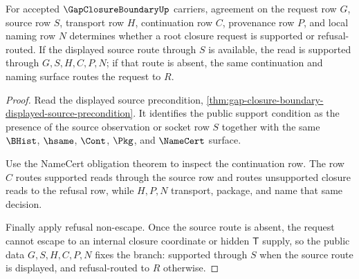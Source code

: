 \begin{theorem}
\label{thm:gap-closure-boundary-closure-request-determinacy}
For accepted $\GapClosureBoundaryUp$ carriers, agreement on the request row $G$, source row $S$, transport row $H$, continuation row $C$, provenance row $P$, and local naming row $N$ determines whether a root closure request is supported or refusal-routed. If the displayed source route through $S$ is available, the read is supported through $G,S,H,C,P,N$; if that route is absent, the same continuation and naming surface routes the request to $R$.
\end{theorem}
\begin{proof}
Read the displayed source precondition, \autoref{thm:gap-closure-boundary-displayed-source-precondition}. It identifies the public support condition as the presence of the source observation or socket row $S$ together with the same $\BHist$, $\hsame$, $\Cont$, $\Pkg$, and $\NameCert$ surface.

Use the NameCert obligation theorem to inspect the continuation row. The row $C$ routes supported reads through the source row and routes unsupported closure reads to the refusal row, while $H,P,N$ transport, package, and name that same decision.

Finally apply refusal non-escape. Once the source route is absent, the request cannot escape to an internal closure coordinate or hidden $\mathsf{T}$ supply, so the public data $G,S,H,C,P,N$ fixes the branch: supported through $S$ when the source route is displayed, and refusal-routed to $R$ otherwise.
\end{proof}

